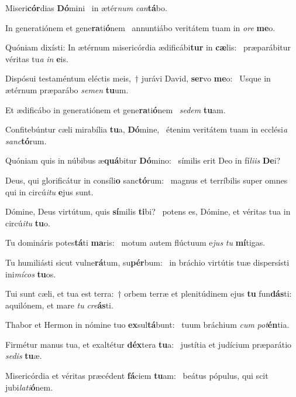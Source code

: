 \item Miseri\textbf{cór}dias \textbf{Dó}mini~\psstar{} in ætér\textit{num} \textit{can}\textbf{tá}bo.
\item In generatiónem et gene\textbf{ra}ti\textbf{ó}\-nem~\psstar{} annuntiábo veritátem tuam in \textit{ore} \textbf{me}o.
\item Quóniam dixísti: In ætérnum misericórdia ædificábi\textbf{tur} in \textbf{cæ}lis:~\psstar{} præparábitur véritas tu\textit{a} \textit{in} \textbf{e}is.
\item Dispósui testaméntum eléctis meis,~† jurávi David, \textbf{ser}vo \textbf{me}o:~\psstar{} Usque in ætérnum præparábo \textit{semen} \textbf{tu}um.
\item Et ædificábo in generatiónem et gene\textbf{ra}ti\textbf{ó}nem~\psstar{} \textit{sedem} \textbf{tu}am.
\item Confitebúntur cæli mirabília \textbf{tu}a, \textbf{Dó}mine,~\psstar{} étenim veritátem tuam in ecclési\textit{a} \textit{sanc}\textbf{tó}rum.
\item Quóniam quis in núbibus æ\textbf{quá}bitur \textbf{Dó}mino:~\psstar{} símilis erit Deo in fí\textit{liis} \textbf{De}i?
\item Deus, qui glorificátur in consíli\textbf{o} sanc\textbf{tó}rum:~\psstar{} magnus et terríbilis super omnes qui in circú\textit{itu} \textbf{e}jus sunt.
\item Dómine, Deus virtútum, quis \textbf{sí}milis \textbf{ti}bi?~\psstar{} potens es, Dómine, et véritas tua in circú\textit{itu} \textbf{tu}o.
\item Tu domináris potes\textbf{tá}ti \textbf{ma}ris:~\psstar{} motum autem flúctuum e\textit{jus} \textit{tu} \textbf{mí}tigas.
\item Tu humiliásti sicut vulne\textbf{rá}\-tum, su\textbf{pér}bum:~\psstar{} in bráchio virtútis tuæ dispersísti ini\textit{mícos} \textbf{tu}os.
\item Tui sunt cæli, et tua est terra:~† orbem terræ et plenitúdinem ejus \textbf{tu} fun\textbf{dás}ti:~\psstar{} aquilónem, et mare \textit{tu} \textit{cre}\textbf{ás}ti.
\item Thabor et Hermon in nómine tuo \textbf{ex}sul\textbf{tá}bunt:~\psstar{} tuum bráchium \textit{cum} \textit{pot}\textbf{én}tia.
\item Firmétur manus tua, et exaltétur \textbf{déx}tera \textbf{tu}a:~\psstar{} justítia et judícium præparátio \textit{sedis} \textbf{tu}æ.
\item Misericórdia et véritas præcédent \textbf{fá}ciem \textbf{tu}am:~\psstar{} beátus pópulus, qui scit jubi\textit{lati}\textbf{ó}nem.
